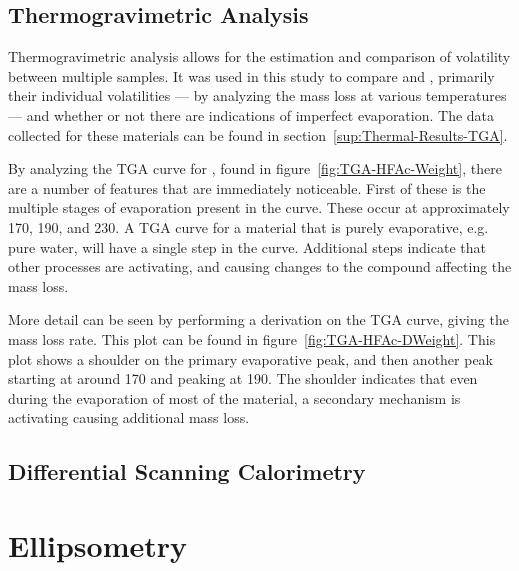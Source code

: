 
\subsection{Thermogravimetric Analysis}

Thermogravimetric analysis allows for the estimation and comparison of volatility between multiple samples. It was used in this study to compare \HFAc{} and \TMHD{}, primarily their individual volatilities --- by analyzing the mass loss at various temperatures --- and whether or not there are indications of imperfect evaporation. The data collected for these materials can be found in section~\vref{sup:Thermal-Results-TGA}. 

By analyzing the TGA curve for \HFAc{}, found in figure~\vref{fig:TGA-HFAc-Weight}, there are a number of features that are immediately noticeable. First of these is the multiple stages of evaporation present in the curve. These occur at approximately 170, 190, and 230\degC{}. A TGA curve for a material that is purely evaporative, e.g. pure water, will have a single step in the curve. Additional steps indicate that other processes are activating, and causing changes to the compound affecting the mass loss. 

More detail can be seen by performing a derivation on the TGA curve, giving the mass loss rate. This plot can be found in figure~\vref{fig:TGA-HFAc-DWeight}. This plot shows a shoulder on the primary evaporative peak, and then another peak starting at around 170\degC{} and peaking at 190\degC{}. The shoulder indicates that even during the evaporation of most of the material, a secondary mechanism is activating causing additional mass loss. 




\subsection{Differential Scanning Calorimetry}


\section{Ellipsometry}
\label{chap:Results-Ellipsometry}



